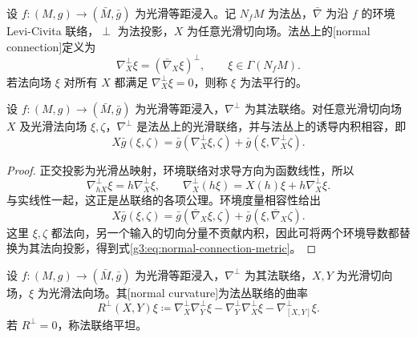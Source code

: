 \begin{definition}\label{g3:def:normal-connection}
	设 \(f:(M,g)\to(\bar M,\bar g)\) 为光滑等距浸入。记 \(N_fM\) 为法丛，\(\bar\nabla\) 为沿 \(f\) 的环境 Levi-Civita 联络，\(\perp\) 为法投影，\(X\) 为任意光滑切向场。法丛上的[normal connection]定义为
	\[
		\nabla^\perp_X\xi=(\bar\nabla_X\xi)^\perp,
		\qquad \xi\in\Gamma(N_fM).
	\]
	若法向场 \(\xi\) 对所有 \(X\) 都满足 \(\nabla^\perp_X\xi=0\)，则称 \(\xi\) 为法平行的。
\end{definition}

\begin{proposition}\label{g3:prop:normal-connection-metric}
	设 \(f:(M,g)\to(\bar M,\bar g)\) 为光滑等距浸入，\(\nabla^\perp\) 为其法联络。对任意光滑切向场 \(X\) 及光滑法向场 \(\xi,\zeta\)，\(\nabla^\perp\) 是法丛上的光滑联络，并与法丛上的诱导内积相容，即
	\begin{equation}\label{g3:eq:normal-connection-metric}
		X\bar g(\xi,\zeta)
		=\bar g(\nabla^\perp_X\xi,\zeta)
			+\bar g(\xi,\nabla^\perp_X\zeta).
	\end{equation}
\end{proposition}
\begin{proof}
	正交投影为光滑丛映射，环境联络对求导方向为函数线性，所以
	\[
		\nabla^\perp_{hX}\xi=h\nabla^\perp_X\xi,\qquad
		\nabla^\perp_X(h\xi)=X(h)\xi+h\nabla^\perp_X\xi.
	\]
	与实线性一起，这正是丛联络的各项公理。环境度量相容性给出
	\[
		X\bar g(\xi,\zeta)
		=\bar g(\bar\nabla_X\xi,\zeta)+\bar g(\xi,\bar\nabla_X\zeta).
	\]
	这里 \(\xi,\zeta\) 都法向，另一个输入的切向分量不贡献内积，因此可将两个环境导数都替换为其法向投影，得到式\eqref{g3:eq:normal-connection-metric}。
\end{proof}

\begin{definition}\label{g3:def:normal-curvature}
	设 \(f:(M,g)\to(\bar M,\bar g)\) 为光滑等距浸入，\(\nabla^\perp\) 为其法联络，\(X,Y\) 为光滑切向场，\(\xi\) 为光滑法向场。其[normal curvature]为法丛联络的曲率
	\begin{equation}\label{g3:eq:normal-curvature-definition}
		R^\perp(X,Y)\xi
		\coloneqq\nabla^\perp_X\nabla^\perp_Y\xi
			-\nabla^\perp_Y\nabla^\perp_X\xi
			-\nabla^\perp_{[X,Y]}\xi.
	\end{equation}
	若 \(R^\perp=0\)，称法联络平坦。
\end{definition}

